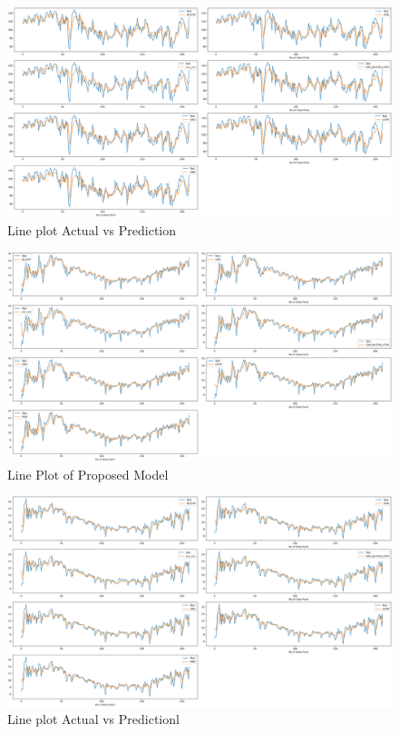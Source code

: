 \documentclass[a4paper,fleqn]{cas-sc}
\begin{document}
      
      
      \begin{figure}[!ht]
      \centering
      \includegraphics[width=\textwidth]{Bengaluru_act vs pred}
      \caption{Line plot Actual vs Prediction}
      \label{Line plot5}
      \end{figure}
      
      
      \begin{figure}[!ht]
      \centering
      \includegraphics[width=\textwidth]{Bhuj_act vs pred}
      \caption{Line Plot of Proposed Model}
      \label{Line plot6}
      \end{figure}
      
      
      
      \begin{figure}[!ht]
      \centering
      \includegraphics[width=\textwidth]{hyderabad_act vs pred}
      \caption{Line plot Actual vs Predictionl}
      \label{Line plot7}
      \end{figure}
      
\end{document}

